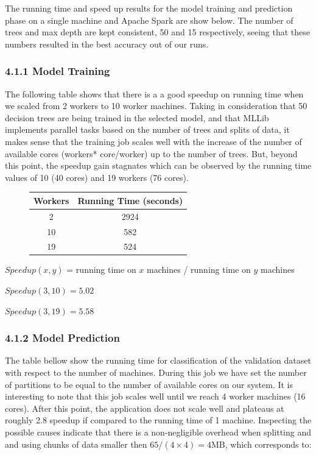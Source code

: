 \documentclass{neu_handout}
\begin{document}
The running time and speed up results for the model training and prediction phase on a single machine and Apache Spark are show below. The number of trees and max depth are kept consistent, 50 and 15 respectively, seeing that these numbers resulted in the best accuracy out of our runs.

\subsubsection*{4.1.1 Model Training}

The following table shows that there is a a good speedup on running time when we scaled from 2 workers to 10 worker machines. Taking in consideration that 50 decision trees are being trained in the selected model, and that MLLib implements parallel tasks based on the number of trees and splits of data, it makes sense that the training job scales well with the increase of the number of available cores (workers* core/worker) up to the number of trees. But, beyond this point, the speedup gain stagnates which can be observed by the running time values of 10 (40 cores) and 19  workers (76 cores). 

\begin{figure}[!htb]
\begin{center}
 \begin{tabular}{||c c ||}
 \hline
Workers & Running Time (seconds) \\ [0.5ex] 
 \hline\hline
  2 & 2924  \\ 
  \hline
 10 & 582  \\ 
  \hline
 19 & 524  \\ [1ex] 
 \hline
\end{tabular}
\end{center}
\end{figure}

\begin{center}
$Speed up(x,y)$ = running time on $x$ machines / running time on $y$ machines

$Speed up(3,10) = 5.02$

$Speed up(3,19) = 5.58$
\end{center}

\subsubsection*{4.1.2 Model Prediction}

The table bellow show the running time for classification of the validation dataset with respect to the number of machines. During this job we have set the number of partitions to be equal to the number of available cores on our system. It is interesting to note that this job scales well until we reach 4 worker machines (16 cores). After this point, the application does not scale well and plateaus at roughly 2.8 speedup if compared to the running time of 1 machine. Inspecting the possible causes indicate that there is a non-negligible overhead when splitting and and using chunks of data smaller then $65/(4\times 4)=4$MB, which corresponds to:
\end{document}
